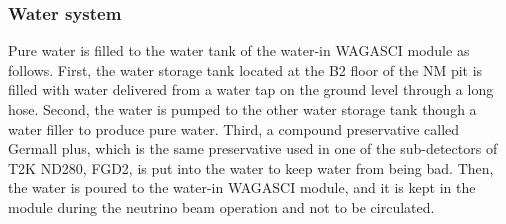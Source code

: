 \subsubsection{Water system}
Pure water is filled to the water tank of the water-in WAGASCI module as follows.
First, the water storage tank located at the B2 floor of the NM pit is filled with water delivered from a water tap on the ground level through a long hose. 
Second, the water is pumped to the other water storage tank though a water filler to produce pure water.
Third, a compound preservative called Germall plus, which is the same preservative used in one of the sub-detectors of T2K ND280, FGD2, is put into the water to keep water from being bad.
Then, the water is poured to the water-in WAGASCI module, and it is kept in the module during the neutrino beam operation and not to be circulated.

